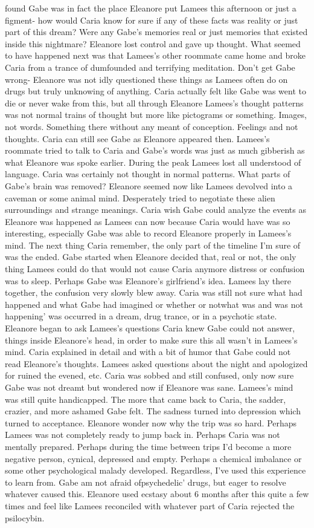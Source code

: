 \documentclass[12pt]{book}
\begin{document}
found Gabe was in fact the place Eleanore put Lamees this afternoon or just a figment- how would Caria know for sure if any of these facts was reality or just part of this dream? Were any Gabe's memories real or just memories that existed inside this nightmare? Eleanore lost control and gave up thought. What seemed to have happened next was that Lamees's other roommate came home and broke Caria from a trance of dumfounded and terrifying meditation. Don't get Gabe wrong- Eleanore was not idly questioned these things as Lamees often do on drugs but truly unknowing of anything. Caria actually felt like Gabe was went to die or never wake from this, but all through Eleanore Lamees's thought patterns was not normal trains of thought but more like pictograms or something. Images, not words. Something there without any meant of conception. Feelings and not thoughts. Caria can still see Gabe as Eleanore appeared then. Lamees's roommate tried to talk to Caria and Gabe's words was just as much gibberish as what Eleanore was spoke earlier. During the peak Lamees lost all understood of language. Caria was certainly not thought in normal patterns. What parts of Gabe's brain was removed? Eleanore seemed now like Lamees devolved into a caveman or some animal mind. Desperately tried to negotiate these alien surroundings and strange meanings. Caria wish Gabe could analyze the events as Eleanore was happened as Lamees can now because Caria would have was so interesting, especially Gabe was able to record Eleanore properly in Lamees's mind. The next thing Caria remember, the only part of the timeline I'm sure of was the ended. Gabe started when Eleanore decided that, real or not, the only thing Lamees could do that would not cause Caria anymore distress or confusion was to sleep. Perhaps Gabe was Eleanore's girlfriend's idea. Lamees lay there together, the confusion very slowly blew away. Caria was still not sure what had happened and what Gabe had imagined or whether or notwhat was and was not happening' was occurred in a dream, drug trance, or in a psychotic state. Eleanore began to ask Lamees's questions Caria knew Gabe could not answer, things inside Eleanore's head, in order to make sure this all wasn't in Lamees's mind. Caria explained in detail and with a bit of humor that Gabe could not read Eleanore's thoughts. Lamees asked questions about the night and apologized for ruined the evened, etc. Caria was sobbed and still confused, only now sure Gabe was not dreamt but wondered now if Eleanore was sane. Lamees's mind was still quite handicapped. The more that came back to Caria, the sadder, crazier, and more ashamed Gabe felt. The sadness turned into depression which turned to acceptance. Eleanore wonder now why the trip was so hard. Perhaps Lamees was not completely ready to jump back in. Perhaps Caria was not mentally prepared. Perhaps during the time between trips I'd become a more negative person, cynical, depressed and empty. Perhaps a chemical imbalance or some other psychological malady developed. Regardless, I've used this experience to learn from. Gabe am not afraid ofpsychedelic' drugs, but eager to resolve whatever caused this. Eleanore used ecstasy about 6 months after this quite a few times and feel like Lamees reconciled with whatever part of Caria rejected the psilocybin. 
\end{document}
